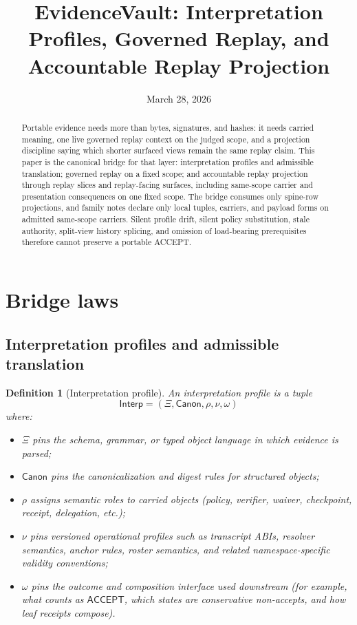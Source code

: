 \documentclass[11pt]{article}
\title{EvidenceVault: Interpretation Profiles, Governed Replay, and Accountable Replay Projection}
\author{}
\date{March 28, 2026}
\newtheorem{definition}{Definition}
\newcommand{\Acc}{\mathsf{ACCEPT}}
\newcommand{\Interp}{\mathsf{Interp}}
\newcommand{\Canon}{\mathsf{Canon}}
\begin{document}
\maketitle

\begin{abstract}
Portable evidence needs more than bytes, signatures, and hashes: it needs carried meaning, one live governed replay context on the judged scope, and a projection discipline saying which shorter surfaced views remain the same replay claim.
This paper is the canonical bridge for that layer: interpretation profiles and admissible translation; governed replay on a fixed scope; and accountable replay projection through replay slices and replay-facing surfaces, including same-scope carrier and presentation consequences on one fixed scope.
The bridge consumes only spine-row projections, and family notes declare only local tuples, carriers, and payload forms on admitted same-scope carriers.
Silent profile drift, silent policy substitution, stale authority, split-view history splicing, and omission of load-bearing prerequisites therefore cannot preserve a portable \textsf{ACCEPT}.
\end{abstract}

\section{Bridge laws}

\subsection*{Interpretation profiles and admissible translation}

\begin{definition}[Interpretation profile]
An interpretation profile is a tuple
\[
\Interp=(\Xi,\Canon,\rho,\nu,\omega)
\]
where:
\begin{itemize}[leftmargin=*]
  \item $\Xi$ pins the schema, grammar, or typed object language in which evidence is parsed;
  \item $\Canon$ pins the canonicalization and digest rules for structured objects;
  \item $\rho$ assigns semantic roles to carried objects (policy, verifier, waiver, checkpoint, receipt, delegation, \emph{etc.});
  \item $\nu$ pins versioned operational profiles such as transcript ABIs, resolver semantics, anchor rules, roster semantics, and related namespace-specific validity conventions;
  \item $\omega$ pins the outcome and composition interface used downstream (for example, what counts as $\Acc$, which states are conservative non-accepts, and how leaf receipts compose).
\end{itemize}
\end{definition}
\end{document}
